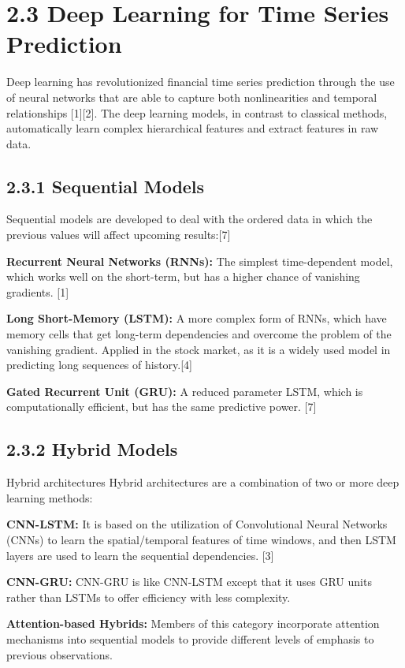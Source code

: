 \documentclass[12pt,a4paper]{report}
\begin{document}
\section{2.3 Deep Learning for Time Series Prediction}
Deep learning has revolutionized financial time series prediction through the use of neural networks that are able to capture both nonlinearities and temporal relationships [1][2]. The deep learning models, in contrast to classical methods, automatically learn complex hierarchical features and extract features in raw data.

\subsection{2.3.1 Sequential Models}
Sequential models are developed to deal with the ordered data in which the previous values will affect upcoming results:[7]

\textbf{Recurrent Neural Networks (RNNs):} The simplest time-dependent model, which works well on the short-term, but has a higher chance of vanishing gradients. [1]

\textbf{Long Short-Memory (LSTM):} A more complex form of RNNs, which have memory cells that get long-term dependencies and overcome the problem of the vanishing gradient. Applied in the stock market, as it is a widely used model in predicting long sequences of history.[4]

\textbf{Gated Recurrent Unit (GRU):} A reduced parameter LSTM, which is computationally efficient, but has the same predictive power. [7]

\subsection{2.3.2 Hybrid Models}
Hybrid architectures Hybrid architectures are a combination of two or more deep learning methods:

\textbf{CNN-LSTM:} It is based on the utilization of Convolutional Neural Networks (CNNs) to learn the spatial/temporal features of time windows, and then LSTM layers are used to learn the sequential dependencies. [3]

\textbf{CNN-GRU:} CNN-GRU is like CNN-LSTM except that it uses GRU units rather than LSTMs to offer efficiency with less complexity. 

\textbf{Attention-based Hybrids:} Members of this category incorporate attention mechanisms into sequential models to provide different levels of emphasis to previous observations.
\end{document}
